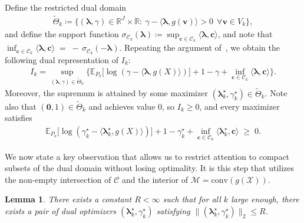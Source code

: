 \documentclass{article}
\theoremstyle{plain}
\newtheorem{lemma}[lemma]{Lemma}
\theoremstyle{definition}
\newcommand{\calC}{\mathcal C}
\newcommand{\calM}{\mathcal M}
\newcommand{\cvec}{\mathbf{c}}
\newcommand{\vvec}{\mathbf{v}}
\newcommand{\boldlambda}{\boldsymbol{\lambda}}
\begin{document}
Define the restricted dual domain
\begin{align}
\widetilde\Theta_k
\coloneqq \Big\{(\boldlambda,\gamma)\in\mathbb R^J\times\mathbb R:\ \gamma-\langle \boldlambda,g(\vvec)\rangle>0\ \ \forall \vvec\in V_k\Big\},
\end{align}
and define the support function $\sigma_{\calC_k}(\boldlambda)\coloneqq \sup_{\cvec\in \calC_k}\langle \boldlambda,\cvec\rangle$, and note  that $\inf_{\cvec\in \calC_k}\langle \boldlambda,\cvec \rangle \;=\; -\,\sigma_{\calC_k}(-\boldlambda)$. Repeating the argument of~, we obtain the following dual representation of $I_k$:
\begin{align}
I_k = \sup_{(\boldlambda,\gamma)\in \widetilde\Theta_k} \Big\{\mathbb E_{P_k}\big[\log(\gamma-\langle\boldlambda,g(X)\rangle)\big] +1-\gamma +\inf_{\cvec \in \calC_k}\langle \boldlambda,\cvec\rangle \Big\}.
\end{align}
Moreover, the supremum is attained by some maximizer $(\boldlambda_k^\star,\gamma_k^\star)\in \widetilde\Theta_k$. Note also that
$(\boldsymbol{0},1)\in \widetilde\Theta_k$ and achieves value $0$, so $I_k\ge 0$, and every maximizer satisfies
\begin{align}
\mathbb E_{P_k}\big[\log(\gamma_k^\star-\langle\boldlambda_k^\star,g(X)\rangle)\big] +1-\gamma_k^\star +\inf_{\cvec\in \calC_k}\langle \boldlambda_k^\star,\cvec \rangle \;\ge\;0. \label{eq:opt-nonneg}
\end{align}

We now state a key observation that allows us to restrict attention to compact subsets of the dual domain without losing optimality.
It is this step that utilizes the non-empty intersection of $\calC$ and the  interior of $\calM = \mathrm{conv}(g(\mathcal X))$.


\begin{lemma}\label{lemma:KL-general-limit-1}
There exists a constant $R<\infty$ such that for all $k$ large enough, there exists a pair of dual optimizers
$(\boldlambda_k^\star,\gamma_k^\star)$ satisfying $\|(\boldlambda_k^\star,\gamma_k^\star)\|_2\le R$.
\end{lemma}
\end{document}

